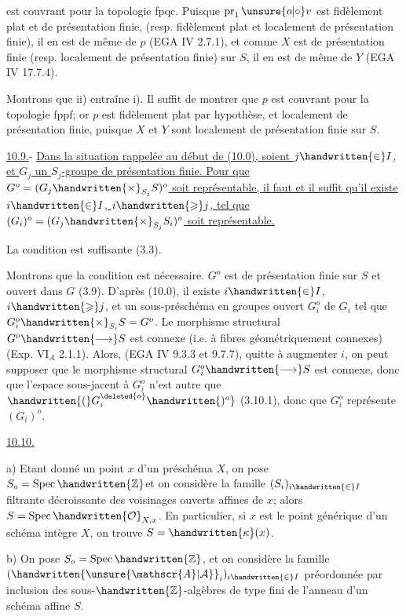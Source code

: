 est couvrant pour la topologie fpqc. Puisque $\operatorname{pr}_1\mathbin{\unsure{o|\circ}} v$ est fidèlement plat et de présentation finie, (resp. fidèlement plat et localement de présentation finie), il en est de même de $p$ (EGA IV 2.7.1), et comme $X$ est de présentation finie (resp. localement de présentation finie) sur $S$, il en est de même de $Y$ (EGA IV 17.7.4).

Montrons que ii) entraîne i). Il suffit de montrer que $p$ est couvrant pour la topologie fppf; or $p$ est fidèlement plat par hypothèse, et localement de présentation finie, puisque $X$ et $Y$ sont localement de présentation finie sur $S$.

\uline{10.9.}- \uline{Dans la situation rappelée au début de (10.0), soient $j\handwritten{\in}I$, et $G_j$ un $S_j$-groupe de présentation finie. Pour que $G^o=(G_j\handwritten{\times}_{S_j}S)^o$ soit représentable, il faut et il suffit qu'il existe  $i\handwritten{\in}I$, $i\handwritten{\geqslant}j$, tel que $(G_i)^o=(G_j\handwritten{\times}_{S_j}S_i)^o$ soit représentable.}

La condition est suffisante (3.3).

Montrons que la condition est nécessaire.  $G^o$ est de présentation finie sur $S$ et ouvert dans $G$ (3.9). D'après (10.0), il existe $i\handwritten{\in}I$, $i\handwritten{\geqslant}j$, et un sous-préschéma en groupes ouvert $G_i^o$ de $G_i$ tel que $G_i^o\handwritten{\times}_{S_i}S=G^o$. Le morphisme structural $G^o\handwritten{\longrightarrow}S$ est connexe (i.e. à fibres géométriquement connexes)(Exp. $\mathrm{VI}_A$ 2.1.1). Alors, (EGA IV 9.3.3 et 9.7.7), quitte à augmenter $i$, on peut supposer que le morphisme structural $G_i^o\handwritten{\longrightarrow}S$ est connexe, donc que l'espace sous-jacent à $G_i^o$ n'est autre que \uline{$\handwritten{(}G_i^{\deleted{o}}\handwritten{)^o}$} (3.10.1), donc que $G_i^o$ représente $(G_i)^o$.

\uline{10.10.} 

a) Etant donné un point $x$ d'un préschéma $X$, on pose $S_o=\operatorname{Spec}\handwritten{\mathbb{Z}}$\handwritten{/}et on considère la famille $(S_i)_{i\handwritten{\in}I}$ filtrante décroissante des voisinages  ouverts affines de $x$; alors $S=\operatorname{Spec}\handwritten{\mathcal{O}}_{X,x}$. En particulier, si $x$ est le point générique d'un schéma intègre $X$, on trouve $S=\handwritten{\kappa}(x)$.

b) On pose $S_o=\operatorname{Spec}\handwritten{\mathbb{Z}}$, et on considère la famille $(\handwritten{\unsure{\mathscr{A}|\mathcal{A}}}_i)_{i\handwritten{\in}I}$ préordonnée par inclusion des sous-$\handwritten{\mathbb{Z}}$-algèbres de type fini de l'anneau d'un schéma affine $S$.
